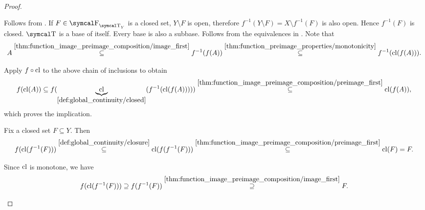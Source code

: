 \begin{proof}\mbox{}
  \begin{description}
     Follows from .
     If \( F \in \CF_{\CT_Y} \) is a closed set, \( Y \setminus F \) is open, therefore \( f^{-1}(Y \setminus F) = X \setminus f^{-1}(F) \) is also open. Hence \( f^{-1}(F) \) is closed.
     \( \CT \) is a base of itself.
     Every base is also a subbase.
     Follows from the equivalences in .
     Note that
    \begin{equation*}
      A
      \overset {\ref{thm:function_image_preimage_composition/image_first}} \subseteq
      f^{-1}(f(A))
      \overset {\ref{thm:function_preimage_properties/monotonicity}} \subseteq
      f^{-1}(\operatorname{cl}(f(A))).
    \end{equation*}

    Apply \( f \circ \operatorname{cl} \) to the above chain of inclusions to obtain
    \begin{equation*}
      f(\operatorname{cl}(A))
      \subseteq
      f(\underbrace{\operatorname{cl}}_{\ref{def:global_continuity/closed}}(f^{-1}(\operatorname{cl}(f(A)))))
      \overset {\ref{thm:function_image_preimage_composition/preimage_first}} \subseteq
      \operatorname{cl}(f(A)),
    \end{equation*}
    which proves the implication.

     Fix a closed set \( F \subseteq Y \). Then
    \begin{equation}\label{def:global_continuity/closure_implies_closed_right}
      f(\operatorname{cl}(f^{-1}(F)))
      \overset {\ref{def:global_continuity/closure}} \subseteq
      \operatorname{cl}(f(f^{-1}(F)))
      \overset {\ref{thm:function_image_preimage_composition/preimage_first}} \subseteq
      \operatorname{cl}(F)
      =
      F.
    \end{equation}

    Since \( \operatorname{cl} \) is monotone, we have
    \begin{equation}\label{def:global_continuity/closure_implies_closed_left}
      f(\operatorname{cl}(f^{-1}(F)))
      \supseteq
      f(f^{-1}(F))
      \overset {\ref{thm:function_image_preimage_composition/image_first}} \supseteq
      F.
    \end{equation}


\end{description}
\end{proof}
